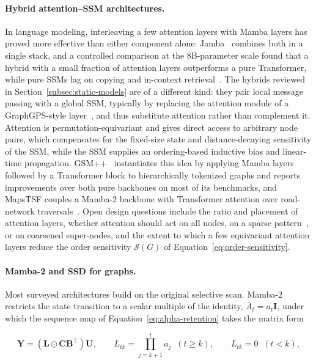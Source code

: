 \documentclass[acmsmall]{acmart}
\begin{document}
\paragraph{Hybrid attention--SSM architectures.}
In language modeling, interleaving a few attention layers with Mamba layers has
proved more effective than either component alone:
Jamba~\cite{lieber2024jamba} combines both in a single stack, and a controlled
comparison at the 8B-parameter scale found that a hybrid with a small fraction
of attention layers outperforms a pure Transformer, while pure SSMs lag on
copying and in-context retrieval~\cite{waleffe2024empirical}.
The hybrids
reviewed in Section~\ref{subsec:static-models} are of a different kind: they pair local message
passing with a global SSM, typically by replacing the attention module of a
GraphGPS-style layer~\cite{rampavsek2022recipe}, and thus substitute attention
rather than complement it. Attention is permutation-equivariant and gives
direct access to arbitrary node pairs, which compensates for the fixed-size
state and distance-decaying sensitivity of the SSM, while the SSM supplies an
ordering-based inductive bias and linear-time propagation.
GSM++~\cite{behrouz2024best} instantiates this idea by applying Mamba layers
followed by a Transformer block to hierarchically tokenized graphs and reports
improvements over both pure backbones on most of its benchmarks, and
MapsTSF couples a Mamba-2 backbone with Transformer attention over road-network
traversals~\cite{wang2025mapstsf}. Open design questions include the ratio and
placement of attention layers, whether attention should act on all nodes, on a
sparse pattern~\cite{shirzad2023exphormer}, or on coarsened super-nodes, and
the extent to which a few equivariant attention layers reduce the order
sensitivity $\mathcal{S}(G)$ of Equation~\eqref{eq:order-sensitivity}.

\paragraph{Mamba-2 and SSD for graphs.}
Most surveyed architectures build on the original selective scan. Mamba-2
restricts the state transition to a scalar multiple of the identity,
$\bar{A}_t=a_t\mathbf{I}$, under which the sequence map of
Equation~\eqref{eq:alpha-retention} takes the matrix form

\begin{equation}
\label{eq:ssd-graph}
\mathbf{Y}
=
\left(\mathbf{L}\odot\mathbf{C}\mathbf{B}^{\top}\right)\mathbf{U},
\qquad
L_{tk}=\prod_{j=k+1}^{t}a_j \;\; (t\ge k),
\qquad
L_{tk}=0 \;\; (t<k),
\end{equation}
\end{document}
